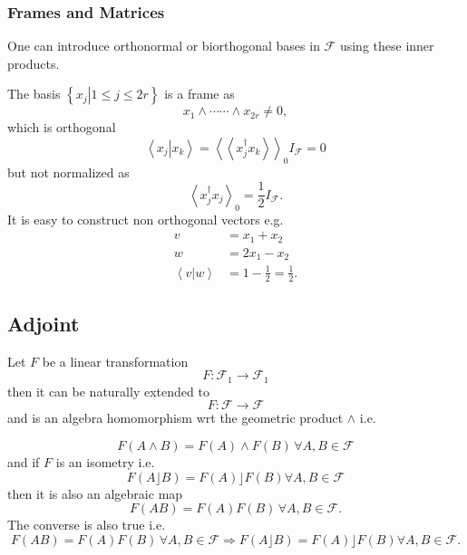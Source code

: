 \documentclass[aps,preprint]{revtex4}%
\begin{document}
\subsubsection{Frames and Matrices}

One can introduce orthonormal or biorthogonal bases in $\mathcal{F}$ using
these inner products.

The basis $\left\{  \left.  x_{j}\right\vert 1\leq j\leq2r\right\}  $ is a
frame as
\begin{equation}
x_{1}\wedge\cdots\cdots\wedge x_{2r}\neq0,
\end{equation}
which is orthogonal
\begin{equation}
\left\langle \left.  x_{j}\right\vert x_{k}\right\rangle =\left\langle
\left\langle x_{j}^{\dagger}x_{k}\right\rangle \right\rangle _{0}%
I_{\mathcal{F}}=0
\end{equation}
but not normalized as
\begin{equation}
\left\langle x_{j}^{\dagger}x_{j}\right\rangle _{0}=\frac{1}{2}I_{\mathcal{F}%
}.
\end{equation}
It is easy to construct non orthogonal vectors e.g.
\begin{align}
v  &  =x_{1}+x_{2}\\
w  &  =2x_{1}-x_{2}\\
\left\langle \left.  v\right\vert w\right\rangle  &  =1-\frac{1}{2}=\frac
{1}{2}.
\end{align}


\subsection{Adjoint}

Let $F$ be a linear transformation
\begin{equation}
F:\mathcal{F}_{1}\rightarrow\mathcal{F}_{1}%
\end{equation}
then it can be naturally extended to
\begin{equation}
F:\mathcal{F}\rightarrow\mathcal{F}%
\end{equation}
and is an algebra homomorphism wrt the geometric product $\wedge$ i.e.%

\begin{equation}
F\left(  A\wedge B\right)  =F\left(  A\right)  \wedge F\left(  B\right)
\,\forall A,B\in\mathcal{F}%
\end{equation}
and if $F$ is an isometry i.e.
\begin{equation}
F\left(  A\rfloor B\right)  =F\left(  A\right)  \rfloor F\left(  B\right)
\forall A,B\in\mathcal{F}%
\end{equation}
then it is also an algebraic map
\begin{equation}
F\left(  AB\right)  =F\left(  A\right)  F\left(  B\right)  \,\forall
A,B\in\mathcal{F}.
\end{equation}
The converse is also true i.e.
\begin{equation}
F\left(  AB\right)  =F\left(  A\right)  F\left(  B\right)  \,\forall
A,B\in\mathcal{F\Rightarrow}F\left(  A\rfloor B\right)  =F\left(  A\right)
\rfloor F\left(  B\right)  \forall A,B\in\mathcal{F}.
\end{equation}
\end{document}
